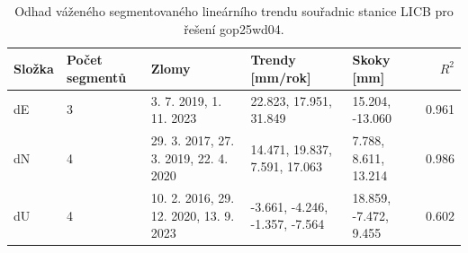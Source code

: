 \begin{table}[htbp]
\caption{Odhad váženého segmentovaného lineárního trendu souřadnic stanice LICB pro řešení gop25wd04.}
\label{tab:gop25wd04_stcd_licb_weighted_multiseg}
\begin{tabular}{lllllr}
\toprule
Složka & Počet segmentů & Zlomy & Trendy [mm/rok] & Skoky [mm] & $R^2$ \\
\midrule
dE & 3 & 3. 7. 2019, 1. 11. 2023 & 22.823, 17.951, 31.849 & 15.204, -13.060 & 0.961 \\
dN & 4 & 29. 3. 2017, 27. 3. 2019, 22. 4. 2020 & 14.471, 19.837, 7.591, 17.063 & 7.788, 8.611, 13.214 & 0.986 \\
dU & 4 & 10. 2. 2016, 29. 12. 2020, 13. 9. 2023 & -3.661, -4.246, -1.357, -7.564 & 18.859, -7.472, 9.455 & 0.602 \\
\bottomrule
\end{tabular}
\end{table}
